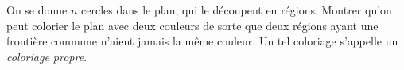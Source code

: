 On se donne $n$ cercles dans le plan, qui le découpent en régions. Montrer qu'on peut colorier le plan avec deux couleurs de sorte que deux régions ayant une frontière commune n'aient jamais la même couleur. Un tel coloriage s'appelle un \emph{coloriage propre}.
